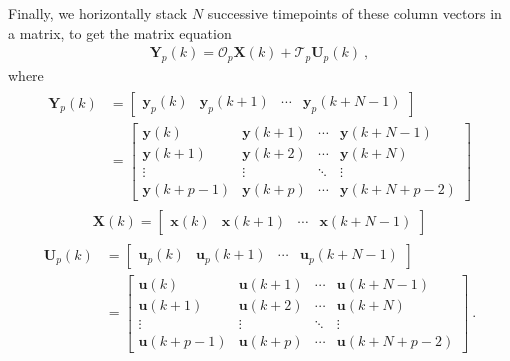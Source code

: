 \documentclass[letterpaper,10pt,english]{sphinxmanual}
\begin{document}
\sphinxAtStartPar
Finally, we horizontally stack \(N\) successive timepoints of these
column vectors in a matrix, to get the matrix equation
\begin{equation*}
\begin{split}\boxed{\bm{Y}_{p}(k) = \mathcal{O}_{p}\bm{X}(k) + \mathcal{T}_{p}\bm{U}_{p}(k)} ~,\end{split}
\end{equation*}
\sphinxAtStartPar
where
\begin{equation*}
\begin{split}\begin{aligned}
\bm{Y}_{p}(k) &= \begin{bmatrix} \bm{y}_{p}(k) & \bm{y}_{p}(k+1) & \cdots & \bm{y}_{p}(k+N-1) \end{bmatrix} \\
&= \begin{bmatrix}
\bm{y}(k)     & \bm{y}(k+1) & \cdots & \bm{y}(k+N-1)\\
\bm{y}(k+1)   & \bm{y}(k+2) & \cdots & \bm{y}(k+N)  \\
\vdots            & \vdots          & \ddots & \vdots \\
\bm{y}(k+p-1) & \bm{y}(k+p) & \cdots & \bm{y}(k+N+p-2)
\end{bmatrix}
\end{aligned}\end{split}
\end{equation*}\begin{equation*}
\begin{split}\bm{X}(k) = \begin{bmatrix} \bm{x}(k) & \bm{x}(k+1) & \cdots & \bm{x}(k+N-1) \end{bmatrix}\end{split}
\end{equation*}\begin{equation*}
\begin{split}\begin{aligned}
\bm{U}_{p}(k) &= \begin{bmatrix} \bm{u}_{p}(k) & \bm{u}_{p}(k+1) & \cdots & \bm{u}_{p}(k+N-1) \end{bmatrix} \\
&= \begin{bmatrix}
\bm{u}(k)     & \bm{u}(k+1) & \cdots & \bm{u}(k+N-1)\\
\bm{u}(k+1)   & \bm{u}(k+2) & \cdots & \bm{u}(k+N)  \\
\vdots            & \vdots          & \ddots & \vdots \\
\bm{u}(k+p-1) & \bm{u}(k+p) & \cdots & \bm{u}(k+N+p-2)
\end{bmatrix}~.
\end{aligned}\end{split}
\end{equation*}
\end{document}
